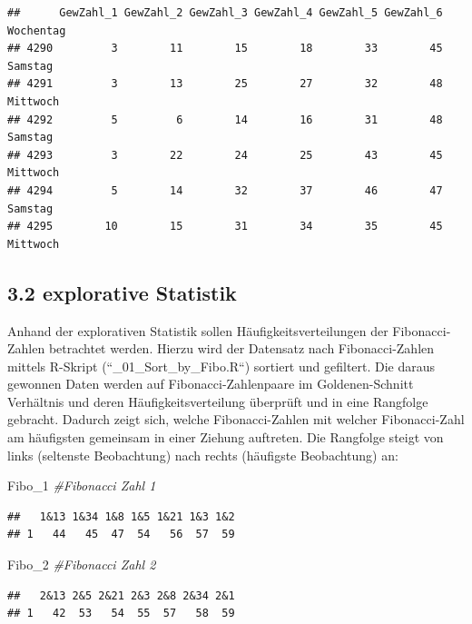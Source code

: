 \documentclass[ngerman,]{article}
\newenvironment{Shaded}{\begin{snugshade}}{\end{snugshade}}
\newcommand{\DecValTok}[1]{\textcolor[rgb]{0.00,0.00,0.81}{#1}}
\newcommand{\CommentTok}[1]{\textcolor[rgb]{0.56,0.35,0.01}{\textit{#1}}}
\newcommand{\NormalTok}[1]{#1}
\begin{document}
\begin{verbatim}
##      GewZahl_1 GewZahl_2 GewZahl_3 GewZahl_4 GewZahl_5 GewZahl_6 Wochentag
## 4290         3        11        15        18        33        45   Samstag
## 4291         3        13        25        27        32        48  Mittwoch
## 4292         5         6        14        16        31        48   Samstag
## 4293         3        22        24        25        43        45  Mittwoch
## 4294         5        14        32        37        46        47   Samstag
## 4295        10        15        31        34        35        45  Mittwoch
\end{verbatim}

\newpage 

\subsection{3.2 explorative Statistik}\label{explorative-statistik}

Anhand der explorativen Statistik sollen Häufigkeitsverteilungen der
Fibonacci-Zahlen betrachtet werden. Hierzu wird der Datensatz nach
Fibonacci-Zahlen mittels R-Skript (``\_01\_Sort\_by\_Fibo.R``) sortiert
und gefiltert. Die daraus gewonnen Daten werden auf
Fibonacci-Zahlenpaare im Goldenen-Schnitt Verhältnis und deren
Häufigkeitsverteilung überprüft und in eine Rangfolge gebracht. Dadurch
zeigt sich, welche Fibonacci-Zahlen mit welcher Fibonacci-Zahl am
häufigsten gemeinsam in einer Ziehung auftreten. Die Rangfolge steigt
von links (seltenste Beobachtung) nach rechts (häufigste Beobachtung)
an:

\begin{Shaded}
\begin{Highlighting}[]
\NormalTok{Fibo_}\DecValTok{1} \CommentTok{#Fibonacci Zahl 1}
\end{Highlighting}
\end{Shaded}

\begin{verbatim}
##   1&13 1&34 1&8 1&5 1&21 1&3 1&2
## 1   44   45  47  54   56  57  59
\end{verbatim}

\begin{Shaded}
\begin{Highlighting}[]
\NormalTok{Fibo_}\DecValTok{2} \CommentTok{#Fibonacci Zahl 2}
\end{Highlighting}
\end{Shaded}

\begin{verbatim}
##   2&13 2&5 2&21 2&3 2&8 2&34 2&1
## 1   42  53   54  55  57   58  59
\end{verbatim}
\end{document}
